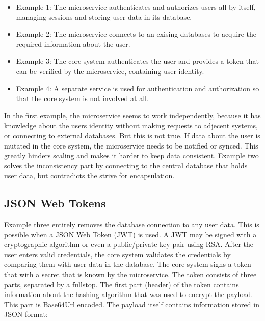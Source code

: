 \begin{itemize}
	\item Example 1: The microservice authenticates and authorizes users all by itself, managing sessions and storing user data in its database.
	\item Example 2: The microservice connects to an exising databases to acquire the required information about the user.
	\item Example 3: The core system authenticates the user and provides a token that can be verified by the microservice, containing user identity.
	\item Example 4: A separate service is used for authentication and authorization so that the core system is not involved at all.
\end{itemize}

In the first example, the microservice seems to work independently, because it has knowledge about the users identity without making requests to adjecent systems, or connecting to external databases. But this is not true. If data about the user is mutated in the core system, the microservice needs to be notified or synced. This greatly hinders scaling and makes it harder to keep data consistent. Example two solves the inconsistency part by connecting to the central database that holds user data, but contradicts the strive for encapsulation.

\subsection{JSON Web Tokens}
Example three entirely removes the database connection to any user data. This is possible when a JSON Web Token (JWT) is used. A JWT may be signed with a cryptographic algorithm or even a public/private key pair using RSA. After the user enters valid credentials, the core system validates the credentials by comparing them with user data in the database. The core system signs a token that with a secret that is known by the microservice. The token consists of three parts, separated by a fullstop. The first part (header) of the token contains information about the hashing algorithm that was used to encrypt the payload. This part is Base64Url encoded. The payload itself contains information stored in JSON format:


\begin{center}
\end{center}

